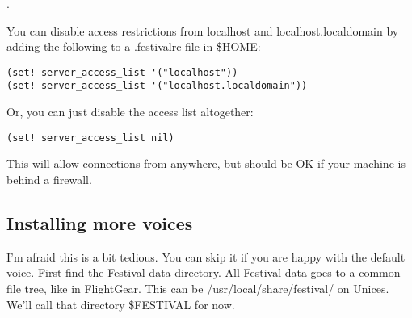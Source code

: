 .

You can disable access restrictions from localhost and localhost.localdomain by adding
the following to a .festivalrc file in \$HOME:
\begin{verbatim}
(set! server_access_list '("localhost"))
(set! server_access_list '("localhost.localdomain"))
\end{verbatim}

Or, you can just disable the access list altogether:

\begin{verbatim}
(set! server_access_list nil)
\end{verbatim}

This will allow connections from anywhere, but should be OK if your machine is behind a
firewall.

\subsection{Installing more voices}

I'm afraid this is a bit tedious. You can skip it if you are happy with the default voice. 
First find the Festival data directory. All Festival data goes to a common file tree, 
like in FlightGear. This can be /usr/local/share/festival/ on Unices. We'll call that 
directory \$FESTIVAL for now.

